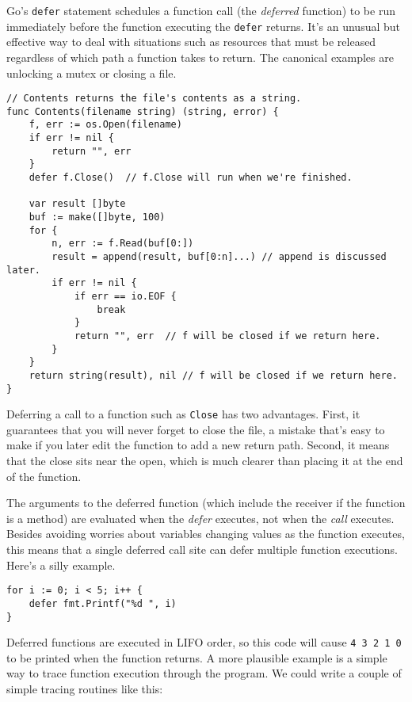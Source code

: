 Go's \texttt{defer} statement schedules a function call (the
\emph{deferred} function) to be run immediately before the function
executing the \texttt{defer} returns. It's an unusual but effective way
to deal with situations such as resources that must be released
regardless of which path a function takes to return. The canonical
examples are unlocking a mutex or closing a file.

\begin{Verbatim}[frame=single]
// Contents returns the file's contents as a string.
func Contents(filename string) (string, error) {
    f, err := os.Open(filename)
    if err != nil {
        return "", err
    }
    defer f.Close()  // f.Close will run when we're finished.

    var result []byte
    buf := make([]byte, 100)
    for {
        n, err := f.Read(buf[0:])
        result = append(result, buf[0:n]...) // append is discussed later.
        if err != nil {
            if err == io.EOF {
                break
            }
            return "", err  // f will be closed if we return here.
        }
    }
    return string(result), nil // f will be closed if we return here.
}
\end{Verbatim}

Deferring a call to a function such as \texttt{Close} has two
advantages. First, it guarantees that you will never forget to close the
file, a mistake that's easy to make if you later edit the function to
add a new return path. Second, it means that the close sits near the
open, which is much clearer than placing it at the end of the function.

The arguments to the deferred function (which include the receiver if
the function is a method) are evaluated when the \emph{defer} executes,
not when the \emph{call} executes. Besides avoiding worries about
variables changing values as the function executes, this means that a
single deferred call site can defer multiple function executions. Here's
a silly example.

\begin{Verbatim}[frame=single]
for i := 0; i < 5; i++ {
    defer fmt.Printf("%d ", i)
}
\end{Verbatim}

Deferred functions are executed in LIFO order, so this code will cause
\texttt{4 3 2 1 0} to be printed when the function returns. A more
plausible example is a simple way to trace function execution through
the program. We could write a couple of simple tracing routines like
this:


